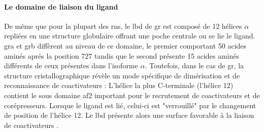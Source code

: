 \documentclass[../main.tex]{subfiles}
\begin{document}
\paragraph{Le domaine de liaison du ligand}
De même que pour la plupart des \glspl{rn}, le \gls{lbd} de \gls{gr} est composé de 12 hélices $\alpha$ repliées en une structure globulaire offrant une poche centrale ou se lie le ligand.
\gls{gra} et \gls{grb} diffèrent au niveau de ce domaine, le premier comportant 50 acides aminés aprés la position 727 tandis que le second présente 15 acides aminés différents de ceux présentes dans l'isoforme $\alpha$.
Toutefois, dans le cas de \gls{gr}, la structure cristallographique révèle un mode spécifique de dimérisation et de reconnaissance de coactivateurs \citep{Bledsoe2002}:
L'hélice la plus C-terminale (l'hélice 12) contient le sous domaine \gls{af2} important pour le recrutement de coactivateurs et de corépresseurs.
Lorsque le ligand est lié, celui-ci est "verrouillé" par le changement de position de l'hélice 12.
Le \gls{lbd} présente alors une surface favorable à la liaison de coactivateurs \citep{Bledsoe2002}.

\end{document}
